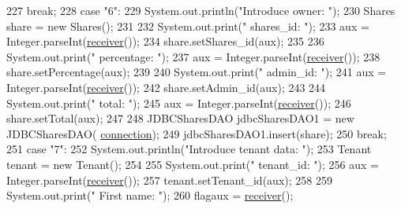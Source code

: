 \begin{DoxyCode}
227                     \textcolor{keywordflow}{break};
228                     \textcolor{keywordflow}{case} \textcolor{stringliteral}{"6"}:
229                         System.out.println(\textcolor{stringliteral}{"Introduce owner: "});
230                         Shares share = \textcolor{keyword}{new} Shares();
231                         
232                         System.out.print(\textcolor{stringliteral}{"    shares\_id: "});
233                         aux =  Integer.parseInt(\mbox{\hyperlink{classcms_1_1_c_m_s_ad13be0e97a0bb295dcedd134942a79b4}{receiver}}());
234                         share.setShares\_id(aux);
235                         
236                         System.out.print(\textcolor{stringliteral}{"    percentage: "});
237                         aux =  Integer.parseInt(\mbox{\hyperlink{classcms_1_1_c_m_s_ad13be0e97a0bb295dcedd134942a79b4}{receiver}}());
238                         share.setPercentage(aux);
239                         
240                         System.out.print(\textcolor{stringliteral}{"    admin\_id: "});
241                         aux =  Integer.parseInt(\mbox{\hyperlink{classcms_1_1_c_m_s_ad13be0e97a0bb295dcedd134942a79b4}{receiver}}());
242                         share.setAdmin\_id(aux);
243                         
244                         System.out.print(\textcolor{stringliteral}{"    total: "});
245                         aux =  Integer.parseInt(\mbox{\hyperlink{classcms_1_1_c_m_s_ad13be0e97a0bb295dcedd134942a79b4}{receiver}}());
246                         share.setTotal(aux);
247                         
248                         JDBCSharesDAO jdbcSharesDAO1 = \textcolor{keyword}{new} JDBCSharesDAO(
      \mbox{\hyperlink{classcms_1_1_c_m_s_afc28cfd2c4356509b85775219b7b1e05}{connection}});
249                         jdbcSharesDAO1.insert(share);
250                     \textcolor{keywordflow}{break};
251                     \textcolor{keywordflow}{case} \textcolor{stringliteral}{"7"}:
252                         System.out.println(\textcolor{stringliteral}{"Introduce tenant data: "});
253                         Tenant tenant = \textcolor{keyword}{new} Tenant();
254                         
255                         System.out.print(\textcolor{stringliteral}{"    tenant\_id: "});
256                         aux =  Integer.parseInt(\mbox{\hyperlink{classcms_1_1_c_m_s_ad13be0e97a0bb295dcedd134942a79b4}{receiver}}());
257                         tenant.setTenant\_id(aux);
258                         
259                         System.out.print(\textcolor{stringliteral}{"    First name: "});
260                         flagaux = \mbox{\hyperlink{classcms_1_1_c_m_s_ad13be0e97a0bb295dcedd134942a79b4}{receiver}}();

\end{DoxyCode}
